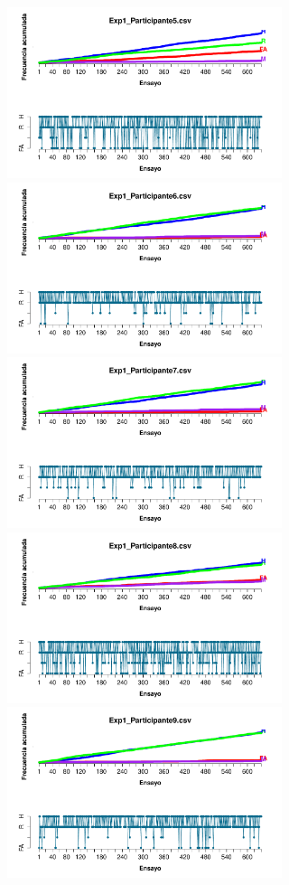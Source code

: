 \documentclass[a4paper ]{article}
\begin{document}
\begin{figure}[th]
\includegraphics[width=9cm, height=5cm]{Figures/Outcome_Exp1_P5} \includegraphics[width=9cm, height=5cm]{Figures/Outcome_Exp1_P6}
\includegraphics[width=9cm, height=5cm]{Figures/Outcome_Exp1_P7} \includegraphics[width=9cm, height=5cm]{Figures/Outcome_Exp1_P8} 
\includegraphics[width=9cm, height=5cm]{Figures/Outcome_Exp1_P9}
\end{figure}
\end{document}
